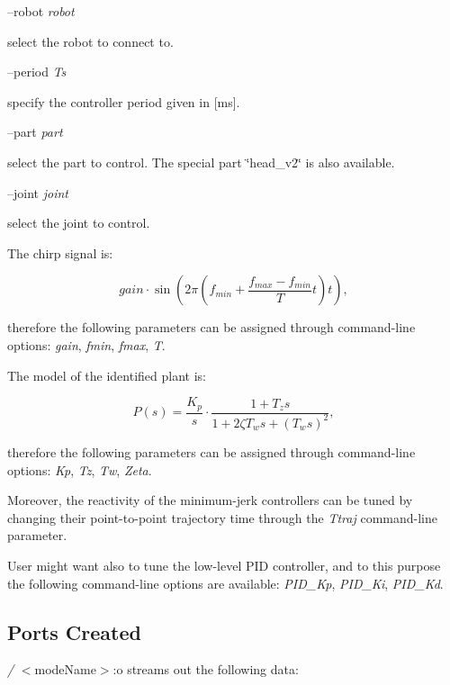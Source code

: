 --robot {\itshape robot} 
\begin{DoxyItemize}
\item select the robot to connect to.
\end{DoxyItemize}

--period {\itshape Ts} 
\begin{DoxyItemize}
\item specify the controller period given in \mbox{[}ms\mbox{]}.
\end{DoxyItemize}

--part {\itshape part} 
\begin{DoxyItemize}
\item select the part to control. The special part \char`\"{}head\+\_\+v2\char`\"{} is also available.
\end{DoxyItemize}

--joint {\itshape joint} 
\begin{DoxyItemize}
\item select the joint to control.
\end{DoxyItemize}

The chirp signal is\+:

\[ gain\cdot\sin\left(2\pi\left(f_{min}+\frac{f_{max}-f_{min}}{T}t\right)t\right), \]

therefore the following parameters can be assigned through command-\/line options\+: {\itshape gain}, {\itshape fmin}, {\itshape fmax}, {\itshape T}.

The model of the identified plant is\+:

\[ P\left(s\right)=\frac{K_p}{s}\cdot\frac{1+T_zs}{1+2\zeta T_ws+\left(T_ws\right)^2}, \]

therefore the following parameters can be assigned through command-\/line options\+: {\itshape Kp}, {\itshape Tz}, {\itshape Tw}, {\itshape Zeta}.

Moreover, the reactivity of the minimum-\/jerk controllers can be tuned by changing their point-\/to-\/point trajectory time through the {\itshape Ttraj} command-\/line parameter.

User might want also to tune the low-\/level P\+ID controller, and to this purpose the following command-\/line options are available\+: {\itshape P\+I\+D\+\_\+\+Kp}, {\itshape P\+I\+D\+\_\+\+Ki}, {\itshape P\+I\+D\+\_\+\+Kd}.\hypertarget{group__icub__signalScope_portsc_sec}{}\subsection{Ports Created}\label{group__icub__signalScope_portsc_sec}
{\itshape /} $<$mode\+Name$>$\+:o streams out the following data\+:

